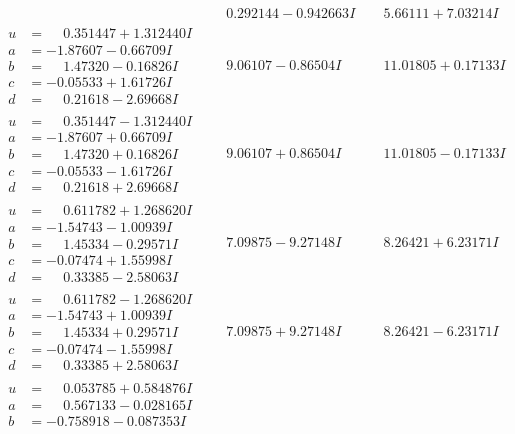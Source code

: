 \documentclass[1p]{elsarticle_modified}
\theoremstyle{definition}
\begin{document}
$$\begin{array}{c|c|c}
 & \phantom{-}0.292144 - 0.942663 I & \phantom{-}5.66111 + 7.03214 I \\ \hline\begin{aligned}
u &= \phantom{-}0.351447 + 1.312440 I \\
a &= -1.87607 - 0.66709 I \\
b &= \phantom{-}1.47320 - 0.16826 I \\
c &= -0.05533 + 1.61726 I \\
d &= \phantom{-}0.21618 - 2.69668 I\end{aligned}
 & \phantom{-}9.06107 - 0.86504 I & \phantom{-}11.01805 + 0.17133 I \\ \hline\begin{aligned}
u &= \phantom{-}0.351447 - 1.312440 I \\
a &= -1.87607 + 0.66709 I \\
b &= \phantom{-}1.47320 + 0.16826 I \\
c &= -0.05533 - 1.61726 I \\
d &= \phantom{-}0.21618 + 2.69668 I\end{aligned}
 & \phantom{-}9.06107 + 0.86504 I & \phantom{-}11.01805 - 0.17133 I \\ \hline\begin{aligned}
u &= \phantom{-}0.611782 + 1.268620 I \\
a &= -1.54743 - 1.00939 I \\
b &= \phantom{-}1.45334 - 0.29571 I \\
c &= -0.07474 + 1.55998 I \\
d &= \phantom{-}0.33385 - 2.58063 I\end{aligned}
 & \phantom{-}7.09875 - 9.27148 I & \phantom{-}8.26421 + 6.23171 I \\ \hline\begin{aligned}
u &= \phantom{-}0.611782 - 1.268620 I \\
a &= -1.54743 + 1.00939 I \\
b &= \phantom{-}1.45334 + 0.29571 I \\
c &= -0.07474 - 1.55998 I \\
d &= \phantom{-}0.33385 + 2.58063 I\end{aligned}
 & \phantom{-}7.09875 + 9.27148 I & \phantom{-}8.26421 - 6.23171 I \\ \hline\begin{aligned}
u &= \phantom{-}0.053785 + 0.584876 I \\
a &= \phantom{-}0.567133 - 0.028165 I \\
b &= -0.758918 - 0.087353 I \\

\end{aligned}
\end{array}$$
\end{document}
